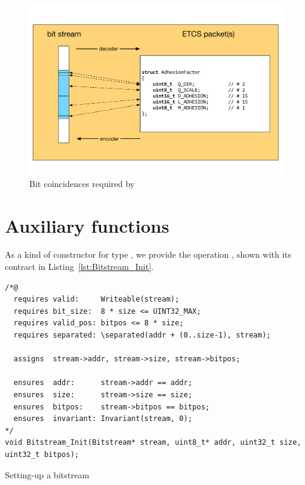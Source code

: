 \begin{figure}
\begin{center}
\includegraphics[width=0.99\textwidth]{figures/equalbits.pdf}
\caption{\label{fig:EqualBits correspondance}
	Bit coincidences required by }
\end{center}
\end{figure}



\FloatBarrier

\section{Auxiliary  functions}
\label{sec:bitstream-aux}


As a kind of constructor for type
, we provide the operation ,
shown with its contract in Listing~\ref{lst:Bitstream_Init}.




\begin{listing}[hbt]
\begin{minipage}{0.99\textwidth}
\begin{lstlisting}[style=acsl-block]
/*@
  requires valid:     Writeable(stream);
  requires bit_size:  8 * size <= UINT32_MAX;
  requires valid_pos: bitpos <= 8 * size;
  requires separated: \separated(addr + (0..size-1), stream);

  assigns  stream->addr, stream->size, stream->bitpos;

  ensures  addr:      stream->addr == addr;
  ensures  size:      stream->size == size;
  ensures  bitpos:    stream->bitpos == bitpos;
  ensures  invariant: Invariant(stream, 0);
*/
void Bitstream_Init(Bitstream* stream, uint8_t* addr, uint32_t size, uint32_t bitpos);
\end{lstlisting}
\end{minipage}
\caption{\label{lst:Bitstream_Init}Setting-up a bitstream}
\end{listing}

